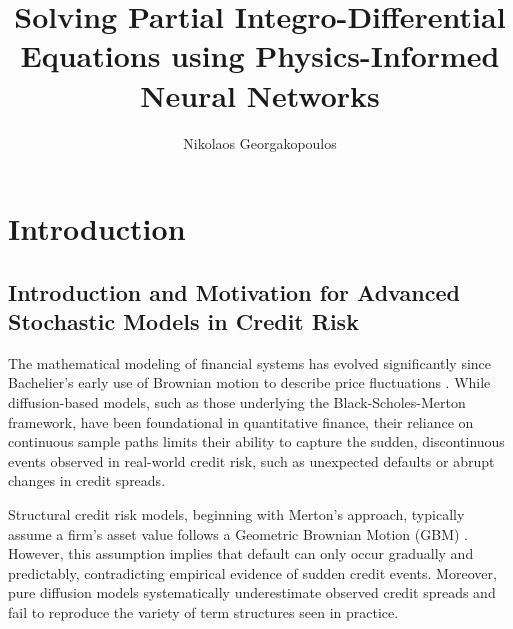 \documentclass[11pt,twoside,openright]{report}
\title{Solving Partial Integro-Differential Equations using Physics-Informed Neural Networks}
\author{Nikolaos Georgakopoulos}
\date{\the\year{}}
\begin{document}
\doublespacing



\maketitle
\makegreektitle








\chapter{Introduction}
\label{chap:intro_levy_credit}

\section{Introduction and Motivation for Advanced Stochastic Models in Credit Risk}
\label{sec:intro_chapter1}

The mathematical modeling of financial systems has evolved significantly since Bachelier's early use of Brownian motion to describe price fluctuations \cite{bachelier1900theorie}. While diffusion-based models, such as those underlying the Black-Scholes-Merton framework, have been foundational in quantitative finance, their reliance on continuous sample paths limits their ability to capture the sudden, discontinuous events observed in real-world credit risk, such as unexpected defaults or abrupt changes in credit spreads.

Structural credit risk models, beginning with Merton's approach, typically assume a firm's asset value follows a Geometric Brownian Motion (GBM) \cite{merton1974pricing}. However, this assumption implies that default can only occur gradually and predictably, contradicting empirical evidence of sudden credit events. Moreover, pure diffusion models systematically underestimate observed credit spreads and fail to reproduce the variety of term structures seen in practice.
\end{document}
